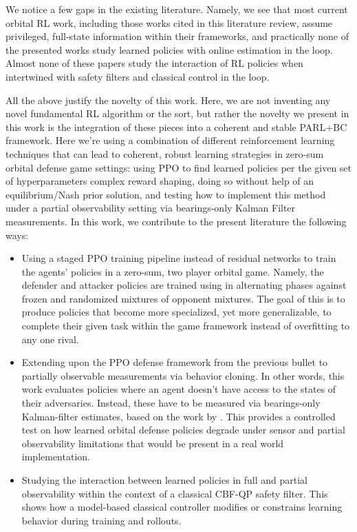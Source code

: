 We notice a few gaps in the existing literature. Namely, we see that most current orbital RL work, including those works cited in this literature review, assume privileged, full-state information within their frameworks, and practically none of the presented works study learned policies with online estimation in the loop. Almost none of these papers study the interaction of RL policies when intertwined with safety filters and classical control in the loop. 

All the above justify the novelty of this work. Here, we are not inventing any novel fundamental RL algorithm or the sort, but rather the novelty we present in this work is the integration of these pieces into a coherent and stable PARL+BC framework. Here we're using a combination of different reinforcement learning techniques that can lead to coherent, robust learning strategies in zero-sum orbital defense game settings: using PPO to find learned policies per the given set of hyperparameters complex reward shaping, doing so without help of an equilibrium/Nash prior solution, and testing how to implement this method under a partial observability setting via bearings-only Kalman Filter measurements. In this work, we contribute to the present literature the following ways:

\begin{itemize}
    \item Using a staged PPO training pipeline instead of residual networks to train the agents' policies in a zero-sum, two player orbital game. Namely, the defender and attacker policies are trained using in alternating phases against frozen and randomized mixtures of opponent mixtures. The goal of this is to produce policies that become more specialized, yet more generalizable, to complete their given task within the game framework instead of overfitting to any one rival. 

    \item Extending upon the PPO defense framework from the previous bullet to partially observable measurements via behavior cloning. In other words, this work evaluates policies where an agent doesn't have access to the states of their adversaries. Instead, these have to be measured via bearings-only Kalman-filter estimates, based on the work by \cite{aidala1979kalman}. This provides a controlled test on how learned orbital defense policies degrade under sensor and partial observability limitations that would be present in a real world implementation.
    \item Studying the interaction between learned policies in full and partial observability within the context of a classical CBF-QP safety filter. This shows how a model-based classical controller modifies or constrains learning behavior during training and rollouts.
\end{itemize}


